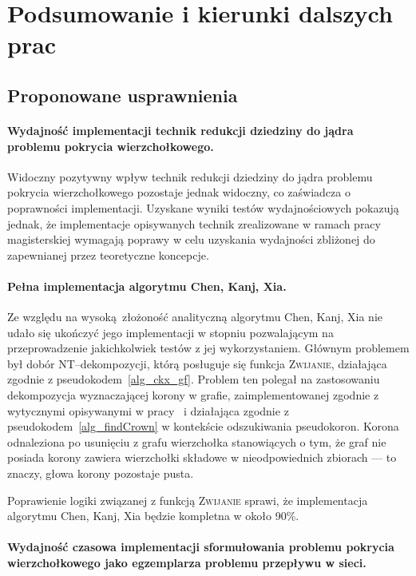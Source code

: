 \chapter{Podsumowanie i kierunki dalszych prac}
\label{summary}
\section{Proponowane usprawnienia}\label{s_improvements}
  \subsubsection{\textbf{Wydajność implementacji technik redukcji dziedziny do jądra problemu pokrycia wierzchołkowego.}}

  Widoczny pozytywny wpływ technik redukcji dziedziny do jądra problemu pokrycia wierzchołkowego pozostaje jednak widoczny, co zaświadcza o poprawności implementacji.
  Uzyskane wyniki testów wydajnościowych pokazują jednak, że implementacje opisywanych technik zrealizowane w ramach pracy magisterskiej wymagają poprawy w celu uzyskania wydajności zbliżonej do zapewnianej przez teoretyczne koncepcje.
  \subsubsection{\textbf{Pełna implementacja algorytmu Chen, Kanj, Xia.}}\label{sss_problems_ckx}

  Ze względu na wysoką złożoność analityczną algorytmu Chen, Kanj, Xia nie udało się ukończyć jego implementacji w stopniu pozwalającym na przeprowadzenie jakichkolwiek testów z jej wykorzystaniem.
  Głównym problemem był dobór NT--dekompozycji, którą posługuje się funkcja \textsc{Zwijanie}, działająca zgodnie z pseudokodem~\ref{alg_ckx_gf}.
  Problem ten polegał na zastosowaniu dekompozycja wyznaczającej korony w grafie, zaimplementowanej zgodnie z wytycznymi opisywanymi w pracy~\cite{KernelizationAlgorithms04} i działająca zgodnie z pseudokodem~\ref{alg_findCrown} w kontekście odszukiwania pseudokoron.
  Korona odnaleziona po usunięciu z grafu wierzchołka stanowiących o tym, że graf nie posiada korony zawiera wierzchołki składowe w nieodpowiednich zbiorach --- to znaczy, głowa korony pozostaje pusta.

  Poprawienie logiki związanej z funkcją \textsc{Zwijanie} sprawi, że implementacja algorytmu Chen, Kanj, Xia będzie kompletna w około 90\%.
  \subsubsection{\textbf{Wydajność czasowa implementacji sformułowania problemu pokrycia wierzchołkowego jako egzemplarza problemu przepływu w sieci.}}

